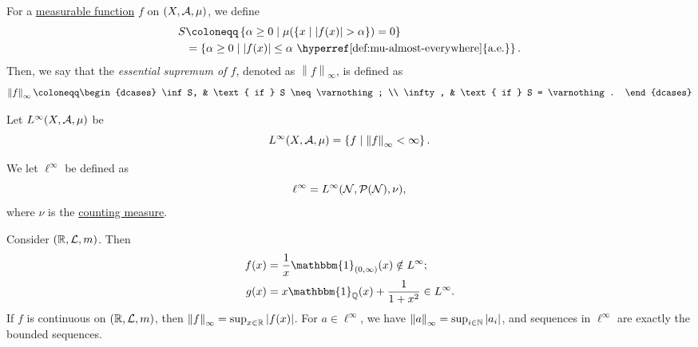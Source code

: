 \begin{definition}\label{def:essential-sumpremum}
	For a \hyperref[def:measurable-function]{measurable function} \(f\) on \((X, \mathcal{\MakeUppercase{a}} , \mu )\), we define
	\[
		\begin{split}
			S &\coloneqq \left\{\alpha \geq 0\mid \mu (\{x\mid \left\vert f(x) \right\vert > \alpha \}) = 0\right\}\\
			&= \left\{\alpha \geq 0\mid \left\vert f(x) \right\vert \leq \alpha \text{ \hyperref[def:mu-almost-everywhere]{a.e.}} \right\}.
		\end{split}
	\]
	Then, we say that the \emph{essential supremum of \(f\)}, denoted as \(\left\lVert f\right\rVert _\infty \), is defined as
	\[
		\left\lVert f\right\rVert _\infty \coloneqq \begin{dcases}
			\inf S,  & \text{ if } S \neq \varnothing; \\
			\infty , & \text{ if } S = \varnothing.
		\end{dcases}
	\]
\end{definition}
\begin{definition}\label{def:L-infinity-space}
	Let \(L^{\infty} (X, \mathcal{\MakeUppercase{a}} , \mu )\) be
	\[
		L^{\infty} (X, \mathcal{\MakeUppercase{a}} , \mu ) = \left\{f\mid \left\lVert f\right\rVert _\infty < \infty \right\}.
	\]
\end{definition}

\begin{definition}\label{def:l-infinity-space}
	We let \(\ell ^{\infty} \) be defined as
	\[
		\ell ^{\infty} = L^{\infty} (\mathcal{\MakeUppercase{n}} , \mathcal{\MakeUppercase{p}} (\mathcal{\MakeUppercase{n}} ), \nu ),
	\]
	where \(\nu\) is the \hyperref[eg:counting-measure]{counting measure}.
\end{definition}

\begin{eg}
	Consider \((\mathbb{\MakeUppercase{r}} , \mathcal{\MakeUppercase{l}} , m)\). Then
	\[
		\begin{split}
			f(x) &= \frac{1}{x} \mathbbm{1}_{(0, \infty )} (x) \notin L^{\infty}; \\
			g(x) &= x \mathbbm{1}_{\mathbb{\MakeUppercase{q}} }(x) + \frac{1}{1 + x^{2} } \in L^{\infty}.
		\end{split}
	\]
	If \(f\) is continuous on \((\mathbb{\MakeUppercase{r}} , \mathcal{\MakeUppercase{l}} , m)\), then \(\left\lVert f\right\rVert _\infty = \sup _{x\in \mathbb{\MakeUppercase{r}} }\left\vert f(x) \right\vert \).
	For \(a\in \ell ^{\infty} \), we have \(\left\lVert a\right\rVert _\infty = \sup _{i\in \mathbb{\MakeUppercase{n}} }\left\vert a_{i}  \right\vert\), and sequences in \(\ell ^{\infty} \)
	are exactly the bounded sequences.
\end{eg}


